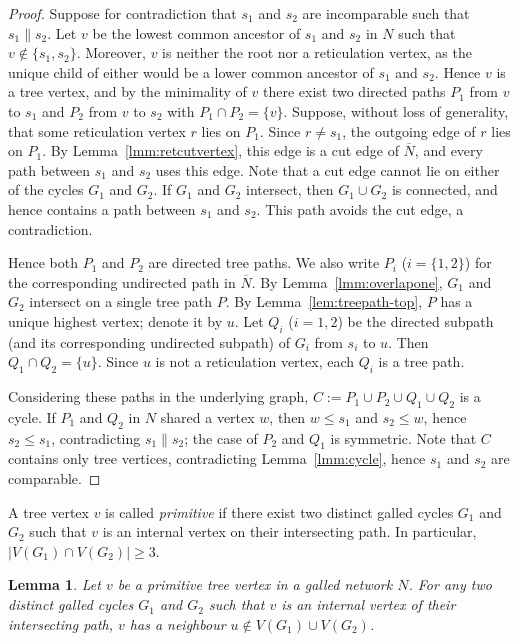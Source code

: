 \documentclass[pdflatex,sn-mathphys-num]{sn-jnl}
\theoremstyle{thmstyleone}%
\theoremstyle{thmstyletwo}%
\newtheorem{lemma}{Lemma}
\theoremstyle{thmstylethree}%
\begin{document}
\begin{proof}
Suppose for contradiction that $s_1$ and $s_2$ are incomparable such  that $s_1 \parallel s_2$. Let $v$ be the lowest common ancestor of $s_1$ and $s_2$ in $N$ such that $v \notin \{s_1, s_2\}$. Moreover, $v$ is neither the root nor a reticulation vertex, as the unique child of either would be a lower common ancestor of $s_1$ and $s_2$. Hence $v$ is a tree vertex, and by the minimality of $v$ there exist two directed paths $P_1$ from $v$ to $s_1$ and $P_2$ from $v$ to $s_2$ with $P_1 \cap P_2 = \{v\}$. Suppose, without loss of generality, that some reticulation vertex $r$ lies on $P_1$. Since $r\neq s_1$, the outgoing edge of $r$ lies on $P_1$. By Lemma~\ref{lmm:retcutvertex}, this edge is a cut edge of $\overline N$, and every path between $s_1$ and $s_2$ uses this edge. Note that a cut edge cannot lie on either of the cycles $G_1$ and $G_2$. If $G_1$ and $G_2$ intersect, then $G_1\cup G_2$ is connected, and hence contains a path between $s_1$ and $s_2$. This path avoids the cut edge, a contradiction.

Hence both $P_1$ and $P_2$ are directed tree paths.  We also write $P_i$ ($i=\{1,2\}$) for the corresponding undirected path in $\overline N$. By Lemma~\ref{lmm:overlapone}, $G_1$ and $G_2$ intersect on a single tree path $P$. By Lemma~\ref{lem:treepath-top}, $P$ has a unique highest vertex; denote it by $u$. Let $Q_i$ ($i=1,2$) be the directed subpath (and its corresponding undirected subpath) of $G_i$ from $s_i$ to $u$. Then $Q_1\cap Q_2=\{u\}$. Since $u$ is not a reticulation vertex, each $Q_i$ is a tree path.

Considering these paths in the underlying graph, $C := P_1 \cup P_2 \cup Q_1 \cup Q_2$ is a cycle. If $P_1$ and $Q_2$ in $N$ shared a vertex $w$, then $w\leq s_1$ and $s_2\leq w$, hence $s_2\leq s_1$, contradicting $s_1\parallel s_2$; the case of $P_2$ and $Q_1$ is symmetric. Note that $C$ contains only tree vertices, contradicting Lemma~\ref{lmm:cycle}, hence $s_1$ and $s_2$ are comparable.
\end{proof}



A tree vertex $v$ is called \emph{primitive} if there exist two distinct galled cycles $G_1$ and $G_2$ such that $v$ is an internal vertex on their intersecting path. In particular, $|V(G_1)\cap V(G_2)|\geq 3$.

\begin{lemma}\label{lmm:neighbourprimitive}
Let $v$ be a primitive tree vertex in a galled network $N$. For any two distinct galled cycles $G_1$ and $G_2$ such that $v$ is an internal vertex of their intersecting path, $v$ has a neighbour $u\notin V(G_1)\cup V(G_2)$.
\end{lemma}
\end{document}

